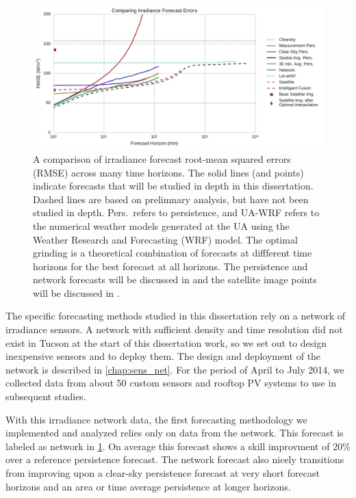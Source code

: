 \begin{figure}[h]
\includegraphics[width=\textwidth]{figs/timehorizon.pdf}
\caption[Irradiance forecast errors across forecast horizons]{A
  comparison of irradiance forecast root-mean squared errors (RMSE)
  across many time horizons. The solid lines (and points) indicate
  forecasts that will be studied in depth in this dissertation. Dashed
  lines are based on prelimnary analysis, but have not been studied in
  depth. Pers.\ refers to persistence, and UA-WRF refers to the
  numerical weather models generated at the UA using the Weather
  Research and Forecasting (WRF) model. The optimal grinding is a
  theoretical combination of forecasts at diffferent time horizons for
  the best forecast at all horizons. The persistence and network
  forecasts will be discussed in  and the satellite
  image points will be discussed in .}
\label{fig:newshitplot}
\end{figure}

The specific forecasting methods studied in this dissertation rely on
a network of irradiance sensors.
A network with sufficient density and time resolution did not exist in
Tucson at the start of this dissertation work, so we set out to design
inexpensive sensors and to deploy them.
The design and deployment of the network is described in
\cref{chap:sens_net}.
For the period of April to July 2014, we collected data from about 50
custom sensors and rooftop PV systems to use in subsequent studies.

With this irradiance network data, the first forecasting methodology
we implemented and analyzed relies only on data from the network.
This forecast is labeled as network in \cref{fig:newshitplot}.
On average this forecast shows a skill improvment of 20\% over a
reference persistence forecast.
The network forecast also nicely transitions from improving upon a
clear-sky persistence forecast at very short forecast horizons and an
area or time average persistence at longer horizons.

